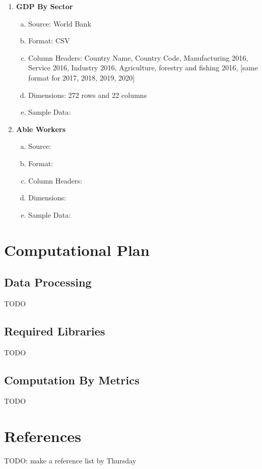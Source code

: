 \documentclass[fontsize=11pt]{article}
\begin{document}
\begin{enumerate}
\begin{enumerate}[(a)]
        \end{enumerate}
    \item \textbf{GDP By Sector}
        \begin{enumerate}[(a)]
            \item Source: World Bank
            \item Format: CSV
            \item Column Headers: Country Name, Country Code, Manufacturing 2016, Service 2016, Industry 2016, Agriculture, forestry and fishing 2016, [same format for 2017, 2018, 2019, 2020]
            \item Dimensions: 272 rows and 22 columns
            \item Sample Data:
        \end{enumerate}
    \item \textbf{Able Workers}
        \begin{enumerate}[(a)]
            \item Source:
            \item Format:
            \item Column Headers:
            \item Dimensions:
            \item Sample Data:
        \end{enumerate}
\end{enumerate}

\section*{Computational Plan}
    \subsection*{Data Processing}
    TODO
    \subsection*{Required Libraries}
    TODO
    \subsection*{Computation By Metrics}
    TODO

\section*{References}
TODO: make a reference list by Thursday

\end{document}
